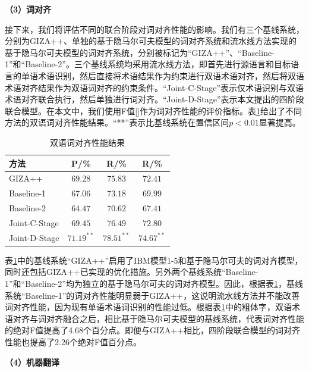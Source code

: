 \textbf{（3）词对齐}

接下来，我们将评估不同的联合阶段对词对齐性能的影响。我们有三个基线系统，分别为GIZA++、单独的基于隐马尔可夫模型的词对齐系统和流水线方法实现的基于隐马尔可夫模型的词对齐系统，分别被标记为“GIZA++”、“Baseline-1”和“Baseline-2”。三个基线系统均采用流水线方法，即首先进行源语言和目标语言的单语术语识别，然后直接将术语结果作为约束进行双语术语对齐，然后将双语术语对齐结果作为双语词对齐的约束条件。“Joint-C-Stage”表示仅术语识别与双语术语对齐联合执行，然后单独进行词对齐。“Joint-D-Stage”表示本文提出的四阶段联合模型。在本文中，我们使用F值[\cite{Fraser:2007,LiuYang:2010}]作为词对齐性能的评价指标。表\ref{Table_word_alignment_result}给出了不同方法的双语词对齐性能结果。“**”表示比基线系统在置信区间$p<0.01$显著提高。

\begin{table}[!htbp]
	\centering
	\begin{tabular}{|l|c|c|c|}
		\hline
		方法  &  P/\% &  R/\% &  R/\% \\
		\hline
		GIZA++        & $69.28$ & $75.83$ & $72.41$ \\ \hline
		Baseline-1    & $67.06$ & $73.18$ & $69.99$ \\ \hline
		Baseline-2    & $64.47$ & $70.62$ & $67.41$ \\ \hline
		Joint-C-Stage & $69.45$ & $76.49$ & $72.80$ \\ \hline
		Joint-D-Stage & $71.19^{**}$ & $78.51^{**}$ & $\mathbf{74.67^{**}}$ \\
		\hline
	\end{tabular}
	\caption{双语词对齐性能结果}
	\label{Table_word_alignment_result}
\end{table}

表\ref{Table_word_alignment_result}中的基线系统“GIZA++”启用了IBM模型1-5和基于隐马尔可夫的词对齐模型，同时还包括GIZA++已实现的优化措施。另外两个基线系统“Baseline-1”和“Baseline-2”均为独立的基于隐马尔可夫的词对齐模型。因此，根据表\ref{Table_word_alignment_result}，基线系统“Baseline-1”的词对齐性能明显弱于GIZA++，这说明流水线方法并不能改善词对齐性能，因为现有单语术语词识别的性能过低。根据表\ref{Table_word_alignment_result}中的粗体字，双语术语对齐与词对齐融合之后，相比基于隐马尔可夫模型的基线系统，代表词对齐性能的绝对F值提高了4.68个百分点。即便与GIZA++相比，四阶段联合模型的词对齐性能也提高了2.26个绝对F值百分点。

\textbf{（4）机器翻译}

